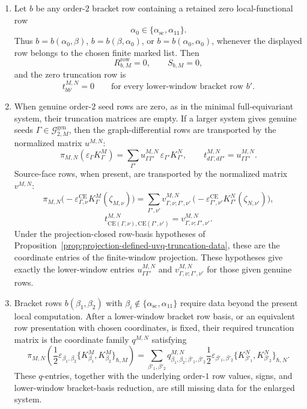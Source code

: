 \begin{prop}
\begin{enumerate}[label=(T\arabic*)]
    \item Let \(b\) be any order-\(2\) bracket row containing a retained
    zero local-functional row
    \[
      \alpha_0\in\{\alpha_{\mathrm{sc}},\alpha_{11}\}.
    \]
    Thus \(b=b(\alpha_0,\beta)\), \(b=b(\beta,\alpha_0)\), or
    \(b=b(\alpha_0,\alpha_0)\), whenever the displayed row belongs to the
    chosen finite marked list.  Then
    \[
      R^{\mathrm{row}}_{b,M}=0,\qquad S_{b,M}=0,
    \]
    and the zero truncation row is
    \[
      t^{M,N}_{bb'}=0
      \qquad
      \text{for every lower-window bracket row }b'.
    \]

    \item When genuine order-\(2\) seed rows are zero, as in the minimal
    full-equivariant system, their truncation matrices are empty.  If a
    larger system gives genuine seeds
    \(\Gamma\in\mathcal G^{\mathrm{gen}}_{2,M}\), then the graph-differential
    rows are transported by the normalized matrix \(u^{M,N}\):
    \[
      \pi_{M,N}(\varepsilon_\Gamma K^M_\Gamma)
        =
      \sum_{\Gamma'}
        u^{M,N}_{\Gamma\Gamma'}\,
        \varepsilon_{\Gamma'}K^N_{\Gamma'},
      \qquad
      t^{M,N}_{d\Gamma,d\Gamma'}=u^{M,N}_{\Gamma\Gamma'}.
    \]
    Source-face rows, when present, are transported by the normalized matrix
    \(v^{M,N}\):
    \[
      \pi_{M,N}
      \bigl(-\varepsilon^{\mathrm{CE}}_{\Gamma,\nu}
      K^M_\Gamma(\zeta_{M,\nu})\bigr)
        =
      \sum_{\Gamma',\nu'}
        v^{M,N}_{\Gamma,\nu;\Gamma',\nu'}\,
        \bigl(-\varepsilon^{\mathrm{CE}}_{\Gamma',\nu'}
        K^N_{\Gamma'}(\zeta_{N,\nu'})\bigr),
    \]
    \[
      t^{M,N}_{\mathrm{CE}(\Gamma,\nu),
        \mathrm{CE}(\Gamma',\nu')}
        =
      v^{M,N}_{\Gamma,\nu;\Gamma',\nu'}.
    \]
    Under the projection-closed row-basis hypotheses of
    Proposition~\ref{prop:projection-defined-uvq-truncation-data}, these are
    the coordinate entries of the finite-window projection.  These
    hypotheses give exactly the lower-window entries
    \(u^{M,N}_{\Gamma\Gamma'}\) and
    \(v^{M,N}_{\Gamma,\nu;\Gamma',\nu'}\) for those given genuine rows.

    \item Bracket rows \(b(\beta_1,\beta_2)\) with
    \(\beta_i\notin\{\alpha_{\mathrm{sc}},\alpha_{11}\}\) require data
    beyond the present local computation.  After a lower-window bracket row basis, or
    an equivalent row presentation with chosen coordinates, is fixed, their
    required truncation matrix is the coordinate family \(q^{M,N}\)
    satisfying
    \[
      \pi_{M,N}\!\left(
        \frac12\varepsilon_{\beta_1,\beta_2}
        \{K^M_{\beta_1},K^M_{\beta_2}\}_{\hbar,M}\right)
       =
      \sum_{\beta'_1,\beta'_2}
        q^{M,N}_{\beta_1,\beta_2;\beta'_1,\beta'_2}
        \frac12\varepsilon_{\beta'_1,\beta'_2}
        \{K^N_{\beta'_1},K^N_{\beta'_2}\}_{\hbar,N}.
    \]
    These \(q\)-entries, together with the underlying order-\(1\) row
    values, signs, and lower-window bracket-basis reduction, are still
    missing data for the enlarged system.
  \end{enumerate}


\end{prop}
